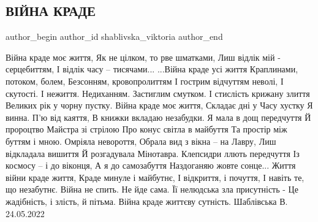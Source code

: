  
 
 
 
 
 
\subsection{ВІЙНА КРАДЕ}
\label{sec:30_05_2022.fb.shablivska_viktoria.1.vijna_krade}
 
\ifcmt
 author_begin
   author_id shablivska_viktoria
 author_end
\fi



\raggedcolumns
\begin{multicols}{2} %
\setlength{\parindent}{0pt}

\Large
\obeycr
Війна краде моє життя,
Як не цілком, то рве шматками,
Лиш відлік мій - серцебиттям,
І відлік часу – тисячами...
\smallskip
...Війна краде усі життя
Краплинами, потоком, болем,
Безсонням, кровопролиттям
І гострим відчуттям неволі,
І скутості. І нежиття.
\smallskip
Недиханням. Застиглим смутком.
І стислість крижану злиття
Великих рік у чорну пустку. 
\smallskip
Війна краде моє життя,
Складає дні у Часу хустку
Я винна. П'ю від каяття,
В книжки вкладаю незабудки.
\smallskip
Я мала в дощ передчуття
Й пророцтво Майстра зі стрілою
Про конус світла в майбуття
Та простір між буттям і мною.
\smallskip
Омріяла невороття,
Обрала вид з вікна – на Лавру,
Лиш відкладала вишиття
Й розгадувала Мінотавра.
\smallskip
Клепсидри ллють передчуття
Із космосу – і до віконця,
А я до самозабуття 
Наздоганяю жовте сонце...
\smallskip
Життя війни краде життя,
Краде минуле і майбутнє,
І відкриття, і почуття,
І навіть те, що незабутнє.
\smallskip
Війна не спить. Не йде сама.
Її нелюдська зла присутність -
Це жадібність, і злість, й пітьма. 
Війна краде життєву сутність.
\smallskip
Шаблівська В.  24.05.2022
\restorecr

\end{multicols} %

